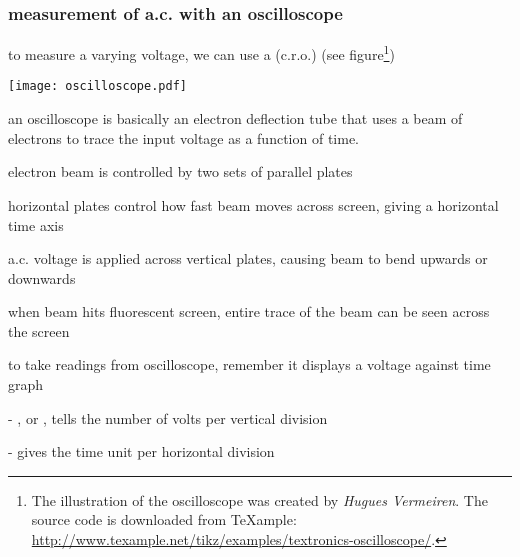 \newpage




\subsubsection{measurement of a.c. with an oscilloscope}

to measure a varying voltage, we can use a  (c.r.o.)  (see figure\footnote{The illustration of the oscilloscope was created by \emph{Hugues Vermeiren}. The source code is downloaded from TeXample: \url{http://www.texample.net/tikz/examples/textronics-oscilloscope/}.  })

\begin{center}
\texttt{[image: oscilloscope.pdf]}
\end{center}

an oscilloscope is basically an electron deflection tube that uses a beam of electrons to trace the input voltage as a function of time.

electron beam is controlled by two sets of parallel plates

horizontal plates control how fast beam moves across screen, giving a horizontal time axis

a.c. voltage is applied across vertical plates, causing beam to bend upwards or downwards

when beam hits fluorescent screen, entire trace of the beam can be seen across the screen

\cmt to take readings from oscilloscope, remember it displays a voltage against time graph

\begin{compactenum}
	\item[-] , or , tells the number of volts per vertical division
	
	\item[-]  gives the time unit per horizontal division
\end{compactenum}




